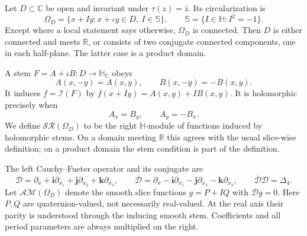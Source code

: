 \documentclass[11pt,a4paper]{article}
\numberwithin{equation}{section}
\theoremstyle{definition}
\theoremstyle{remark}
\newcommand{\R}{\mathbb R}
\newcommand{\C}{\mathbb C}
\newcommand{\HH}{\mathbb H}
\newcommand{\HC}{\mathbb H_{\C}}
\newcommand{\SSS}{\mathbb S}
\newcommand{\SR}{\mathcal{SR}}
\newcommand{\AM}{\mathcal{AM}}
\newcommand{\D}{\mathcal D}
\newcommand{\lap}{\Delta_4}
\newcommand{\cI}{\mathcal I}
\newcommand{\ii}{\mathbf i}
\newcommand{\jj}{\mathbf j}
\newcommand{\kk}{\mathbf k}
\begin{document}
Let $D\subset\C$ be open and invariant under
$\tau(z)=\bar z$. Its circularization is
\[
 \Omega_D=\{x+Iy:x+\iota y\in D,\ I\in\SSS\},
 \qquad \SSS=\{I\in\HH:I^2=-1\}.
\]
Except where a local statement says otherwise, $\Omega_D$ is connected.
Then $D$ is either connected and meets $\R$, or consists of two conjugate
connected components, one in each half-plane. The latter case is a
product domain.

A stem $F=A+\iota B:D\to\HC$ obeys
\[
 A(x,-y)=A(x,y),\qquad B(x,-y)=-B(x,y).
\]
It induces $f=\cI(F)$ by $f(x+Iy)=A(x,y)+I B(x,y)$.
It is holomorphic precisely when
\begin{equation}
 A_x=B_y,\qquad A_y=-B_x.
 \label{eq:CR}
\end{equation}
We define $\SR(\Omega_D)$ to be the right $\HH$-module of functions
induced by holomorphic stems. On a domain meeting $\R$ this agrees with
the usual slice-wise definition; on a product domain the stem condition
is part of the definition.

The left Cauchy--Fueter operator and its conjugate are
\[
 \D=\partial_x+\ii\partial_{x_1}+\jj\partial_{x_2}+\kk\partial_{x_3},
 \qquad
 \overline{\D}=\partial_x-\ii\partial_{x_1}-\jj\partial_{x_2}-\kk\partial_{x_3},
 \qquad \overline{\D}\D=\lap.
\]
Let $\AM(\Omega_D)$ denote the smooth slice functions $g=P+I Q$ with
$\D g=0$. Here $P,Q$ are quaternion-valued, not necessarily real-valued.
At the real axis their parity is understood through the inducing smooth
stem. Coefficients and all period parameters are always multiplied on the
right.
\end{document}
